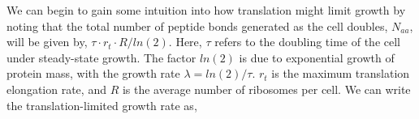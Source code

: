 %

We can begin to gain some intuition into how translation might limit growth by
noting that the total number of peptide bonds generated as the cell doubles,
$N_{aa}$, will be given by, $\tau \cdot r_t \cdot R / ln(2)$. Here, $\tau$
refers to the doubling time of the cell under steady-state growth. The factor
$ln(2)$ is due to exponential growth of protein mass, with the growth rate
$\lambda = ln(2)/\tau$. $r_t$ is the maximum translation elongation rate, and
$R$ is the average number of ribosomes per cell. We can write the
translation-limited growth rate as,

